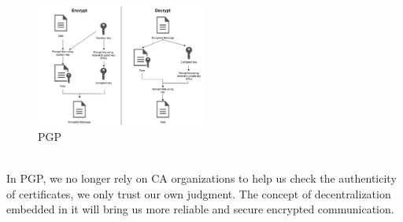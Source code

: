 \begin{figure}[H] %
    \centering %
    \includegraphics[width=0.5\textwidth]{figures/PGP.png} %
    \caption{PGP} %
    \label{Fig.6: PGP} %
\end{figure}
\\
In PGP, we no longer rely on CA organizations to help us check the authenticity of 
certificates, we only trust our own judgment. The concept of decentralization embedded 
in it will bring us more reliable and secure encrypted communication\cite{b36}.